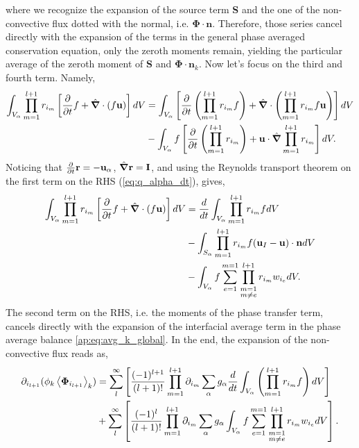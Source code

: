 where we recognize the expansion of the source term \textbf{S} and the one of the non-convective flux dotted with the normal, i.e. $\bm{\Phi}\cdot\textbf{n}$.
Therefore, those series cancel directly with the expansion of the terms in the general phase averaged conservation equation, only the zeroth moments remain, yielding the particular average of the zeroth moment of \textbf{S} and $\bm{\Phi}\cdot \textbf{n}_k$. 
Now let's focus on the third and fourth term. Namely, 
\begin{align*}
    \int_{V_\alpha}\prod_{m=1}^{l+1} r_{i_m}\left[
        \frac{\partial}{\partial t} f 
        + 
        \hat{\bm{\nabla}} \cdot (f \textbf{u}) 
    \right]dV
    &= \int_{V_\alpha} \left[
    \frac{\partial}{\partial t} \left(\prod_{m=1}^{l+1} r_{i_m}  f \right)
    + 
    \hat{\bm{\nabla}} \cdot \left(
    \prod^{l+1}_{m=1}
    r_{i_m} f \textbf{u}
    \right) \right]dV   \\ 
    &- \int_{V_\alpha}f\left[
        \frac{\partial}{\partial t} \left(\prod^{l+1}_{m=1}
        r_{i_m} \right)
        +
        \textbf{u} \cdot
        \hat{\bm{\nabla}} \prod_{m=1}^{l+1} r_{i_m}  
    \right]
    dV.\\
\end{align*}
Noticing that $\frac{\partial}{\partial t} \textbf{r} = - \textbf{u}_\alpha$, $\hat{\bm{\nabla}} \textbf{r} = \textbf{I}$, and using the Reynolds transport theorem on the first term on the RHS (\ref{eq:q_alpha_dt}), gives, 
\begin{align*}
    \int_{V_\alpha}\prod_{m=1}^{l+1} r_{i_m}\left[
        \frac{\partial}{\partial t} f 
        + 
        \hat{\bm{\nabla}} \cdot (f \textbf{u}) 
    \right]dV
    &= \frac{d}{d t} \int_{V_\alpha} 
    \prod_{m=1}^{l+1} r_{i_m}  f dV   \\
    &- \int_{S_\alpha} 
    \prod_{m=1}^{l+1} r_{i_m}  f (\textbf{u}_I - \textbf{u})\cdot \textbf{n} dV \\
    &- \int_{V_\alpha}f \sum_{e=1}^{m=1} 
    \prod^{l+1}_{\substack{m=1\\ m\neq e}} 
    r_{i_m} 
    w_{i_e}
    dV.\\
\end{align*}
The second term on the RHS, i.e. the moments of the phase transfer term, cancels directly with the expansion of the interfacial average term in the phase average balance \ref{ap:eq:avg_k_global}.
In the end, the expansion of the non-convective flux reads as,
\begin{align*}
    \partial_{i_{l+1}}
    (\phi_k \left<\bm{\Phi}_{i_{l+1}}\right>_k)
    & =\sum_l^\infty
    \left[
        \frac{(-1)^{l+1}}{(l+1)!}
        \prod^{l+1}_{m=1}
        \partial_{i_m}
        \sum_{\alpha}
        g_{\alpha}\frac{d}{d t} \int_{V_\alpha}
        \left(\prod_{m=1}^{l+1} r_{i_m}  f \right)dV
    \right]\\
    &+\sum_l^\infty
    \left[
        \frac{(-1)^{l}}{(l+1)!}
        \prod^{l+1}_{m=1}
        \partial_{i_m}
        \sum_{\alpha}
        g_{\alpha}\int_{V_\alpha}
        f\sum_{e=1}^{m=1} 
        \prod^{l+1}_{\substack{m=1\\ m\neq e}} 
        r_{i_m} 
        w_{i_e}
         dV
    \right].\\
\end{align*}
